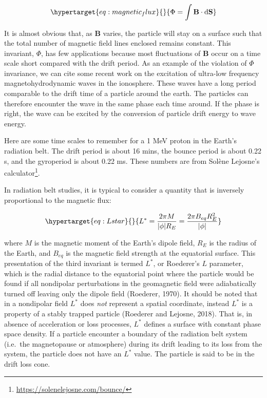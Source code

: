 \documentclass[
  notoc %
]{tufte-book}
\DeclareRobustCommand{\href}[2]{#2\footnote{\url{#1}}}
\begin{document}
\begin{equation}\protect\hypertarget{eq:magnetic_flux}{}{
\Phi = \int\mathbf{B}\cdot \mathrm{d}\mathbf{S}
}\label{eq:magnetic_flux}\end{equation}

It is almost obvious that, as \(\mathbf{B}\) varies, the particle will
stay on a surface such that the total number of magnetic field lines
enclosed remains constant. This invariant, \(\Phi\), has few
applications because most fluctuations of \(\mathbf{B}\) occur on a time
scale short compared with the drift period. As an example of the
violation of \(\Phi\) invariance, we can cite some recent work on the
excitation of ultra-low frequency magnetohydrodynamic waves in the
ionosphere. These waves have a long period comparable to the drift time
of a particle around the earth. The particles can therefore encounter
the wave in the same phase each time around. If the phase is right, the
wave can be excited by the conversion of particle drift energy to wave
energy.

Here are some time scales to remember for a 1 MeV proton in the Earth's
radiation belt. The drift period is about 16 mins, the bounce period is
about 0.22 s, and the gyroperiod is about 0.22 ms. These numbers are
from Solène Lejosne's
\href{https://solenelejosne.com/bounce/}{calculator}.

In radiation belt studies, it is typical to consider a quantity that is
inversely proportional to the magnetic flux:

\begin{equation}\protect\hypertarget{eq:Lstar}{}{
L^\ast = \frac{2\pi M}{|\phi|R_E} = \frac{2\pi B_{eq}R_E^2}{|\phi|}
}\label{eq:Lstar}\end{equation}

where \(M\) is the magnetic moment of the Earth's dipole field, \(R_E\)
is the radius of the Earth, and \(B_{eq}\) is the magnetic field
strength at the equatorial surface. This presentation of the third
invariant is termed \(L^\ast\), or Roederer's \(L\) parameter, which is
the radial distance to the equatorial point where the particle would be
found if all nondipolar perturbations in the geomagnetic field were
adiabatically turned off leaving only the dipole field (Roederer, 1970).
It should be noted that in a nondipolar field \(L^\ast\) does \emph{not}
represent a spatial coordinate, instead \(L^\ast\) is a property of a
stably trapped particle (Roederer and Lejosne, 2018). That is, in
absence of acceleration or loss processes, \(L^\ast\) defines a surface
with constant phase space density. If a particle encounter a boundary of
the radiation belt system (i.e.~the magnetopause or atmosphere) during
its drift leading to its loss from the system, the particle does not
have an \(L^\ast\) value. The particle is said to be in the drift loss
cone.
\end{document}

